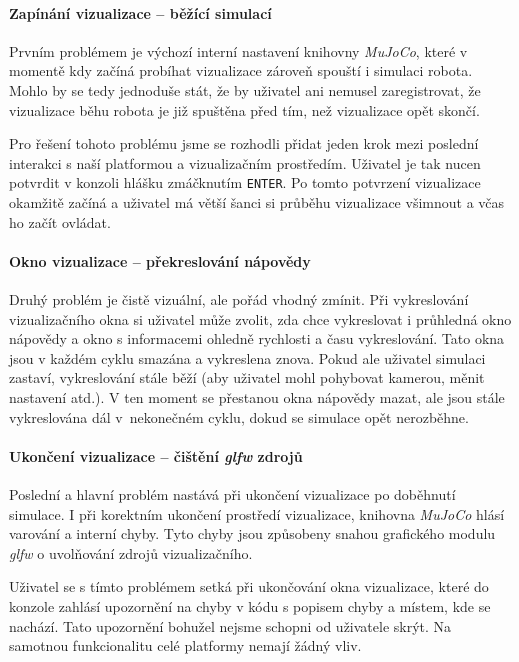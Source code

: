 \paragraph{Zapínání vizualizace -- běžící simulací}
Prvním problémem je výchozí interní nastavení knihovny \emph{MuJoCo}, které
v momentě kdy začíná probíhat vizualizace zároveň spouští i simulaci robota.
Mohlo by se tedy jednoduše stát, že by uživatel ani nemusel zaregistrovat, že
vizualizace běhu robota je již spuštěna před tím, než vizualizace opět skončí.

Pro řešení tohoto problému jsme se rozhodli přidat jeden krok mezi poslední
interakci s naší platformou a vizualizačním prostředím. Uživatel je tak nucen
potvrdit v konzoli hlášku zmáčknutím \texttt{ENTER}. Po tomto potvrzení
vizualizace okamžitě začíná a uživatel má větší šanci si průběhu vizualizace
všimnout a včas ho začít ovládat.

\paragraph{Okno vizualizace -- překreslování nápovědy}
Druhý problém je čistě vizuální, ale pořád vhodný zmínit. Při vykreslování
vizualizačního okna si uživatel může zvolit, zda chce vykreslovat i průhledná
okno nápovědy a okno s informacemi ohledně rychlosti a času vykreslování. Tato
okna jsou v každém cyklu smazána a vykreslena znova. Pokud ale uživatel
simulaci zastaví, vykreslování stále běží (aby uživatel mohl pohybovat kamerou,
měnit nastavení atd.). V ten moment se přestanou okna nápovědy mazat, ale jsou
stále vykreslována dál v~nekonečném cyklu, dokud se simulace opět nerozběhne.

\paragraph{Ukončení vizualizace -- čištění \emph{glfw} zdrojů}
Poslední a hlavní problém nastává při ukončení vizualizace po doběhnutí
simulace. I při korektním ukončení prostředí vizualizace, knihovna
\emph{MuJoCo} hlásí varování a interní chyby. Tyto chyby jsou způsobeny snahou
grafického modulu \emph{glfw} o uvolňování zdrojů vizualizačního.

Uživatel se s tímto problémem setká při ukončování okna vizualizace, které do
konzole zahlásí upozornění na chyby v kódu s popisem chyby a místem, kde se
nachází. Tato upozornění bohužel nejsme schopni od uživatele skrýt. Na samotnou
funkcionalitu celé platformy nemají žádný vliv.

